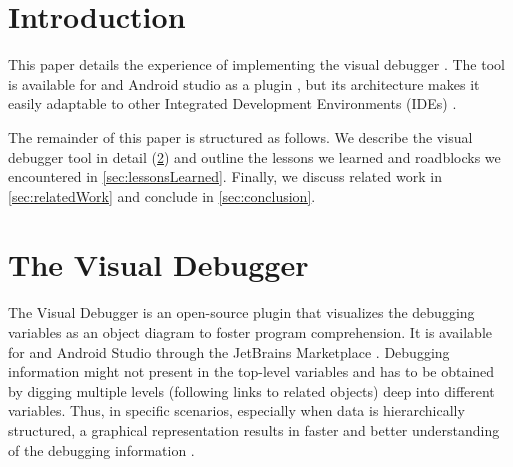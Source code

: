 \documentclass[sigconf]{acmart}
\begin{document}

\maketitle

\section{Introduction}
This paper details the experience of implementing the visual debugger \cite{krauterVisualDebuggerTool2022}.
The tool is available for \intellij and Android studio as a plugin \cite{timkrauterVisualDebuggerIntelliJ2023}, but its architecture makes it easily adaptable to other Integrated Development Environments (IDEs) \cite{krauterVisualDebuggerTool2022}.


The remainder of this paper is structured as follows.
We describe the visual debugger tool in detail (\cref{sec:visualDebugger}) and outline the lessons we learned and roadblocks we encountered in \cref{sec:lessonsLearned}.
Finally, we discuss related work in \cref{sec:relatedWork} and conclude in \cref{sec:conclusion}.


\section{The Visual Debugger} \label{sec:visualDebugger}
The Visual Debugger is an open-source \intellij plugin that visualizes the debugging variables as an object diagram to foster program comprehension.
It is available for \intellij and Android Studio through the JetBrains Marketplace \cite{timkrauterVisualDebuggerIntelliJ2023, timkrauterVisualDebuggerTool2023}.
Debugging information might not present in the top-level variables and has to be obtained by digging multiple levels (following links to related objects) deep into different variables.
Thus, in specific scenarios, especially when data is hierarchically structured, a graphical representation results in faster and better understanding of the debugging information \cite{krauterVisualDebuggerTool2022}.
\end{document}
